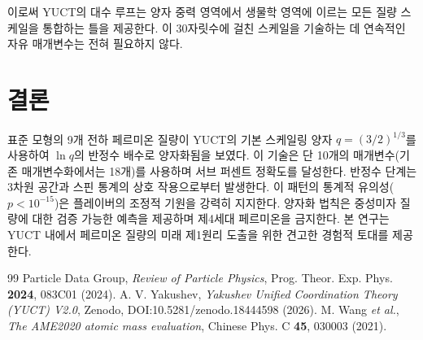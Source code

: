 \documentclass[12pt,a4paper]{article}
\begin{document}
	이로써 YUCT의 대수 루프는 양자 중력 영역에서 생물학 영역에 이르는 모든 질량 스케일을 통합하는 틀을 제공한다. 이 30자릿수에 걸친 스케일을 기술하는 데 연속적인 자유 매개변수는 전혀 필요하지 않다.
	
	\section{결론}
	
	표준 모형의 9개 전하 페르미온 질량이 YUCT의 기본 스케일링 양자 \(q = (3/2)^{1/3}\)를 사용하여 \(\ln q\)의 반정수 배수로 양자화됨을 보였다. 이 기술은 단 10개의 매개변수(기존 매개변수화에서는 18개)를 사용하며 서브 퍼센트 정확도를 달성한다. 반정수 단계는 3차원 공간과 스핀 통계의 상호 작용으로부터 발생한다. 이 패턴의 통계적 유의성(\(p < 10^{-15}\))은 플레이버의 조정적 기원을 강력히 지지한다. 양자화 법칙은 중성미자 질량에 대한 검증 가능한 예측을 제공하며 제4세대 페르미온을 금지한다. 본 연구는 YUCT 내에서 페르미온 질량의 미래 제1원리 도출을 위한 견고한 경험적 토대를 제공한다.
	
	\begin{thebibliography}{99}
		 Particle Data Group, \textit{Review of Particle Physics}, Prog. Theor. Exp. Phys. \textbf{2024}, 083C01 (2024).
		 A. V. Yakushev, \textit{Yakushev Unified Coordination Theory (YUCT) V2.0}, Zenodo, DOI:10.5281/zenodo.18444598 (2026).
		 M. Wang \textit{et al.}, \textit{The AME2020 atomic mass evaluation}, Chinese Phys. C \textbf{45}, 030003 (2021).
	\end{thebibliography}
	
\end{document}
